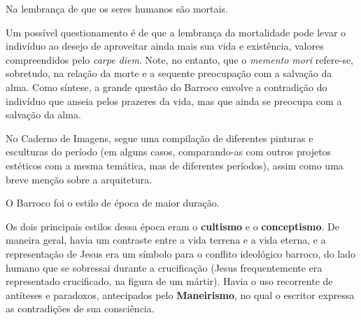 \begin{theorem}
Na lembrança de que os seres humanos são mortais.
\end{theorem}

Um possível questionamento é de que a lembrança da mortalidade pode levar o indivíduo ao desejo de aproveitar ainda mais sua vida e existência, valores compreendidos pelo \textit{carpe diem}. Note, no entanto, que o \textit{memento mori} refere-se, sobretudo, na relação da morte e a sequente preocupação com a salvação da alma. Como síntese, a grande questão do Barroco envolve a contradição do indivíduo que anseia pelos prazeres da vida, mas que ainda se preocupa com a salvação da alma.

No Caderno de Imagens, segue uma compilação de diferentes pinturas e esculturas do período (em alguns casos, comparando-as com outros projetos estéticos com a mesma temática, mas de diferentes períodos), assim como uma breve menção sobre a arquitetura.

O Barroco foi o estilo de época de maior duração. 

Os dois principais estilos dessa época eram o \textbf{cultismo} e o \textbf{conceptismo}. De maneira geral, havia um contraste entre a vida terrena e a vida eterna, e a representação de Jesus era um símbolo para o conflito ideológico barroco, do lado humano que se sobressai durante a crucificação (Jesus frequentemente era representado crucificado, na figura de um mártir). Havia o uso recorrente de antíteses e paradoxos, antecipados pelo \textbf{Maneirismo}, no qual o escritor expressa as contradições de sua consciência.